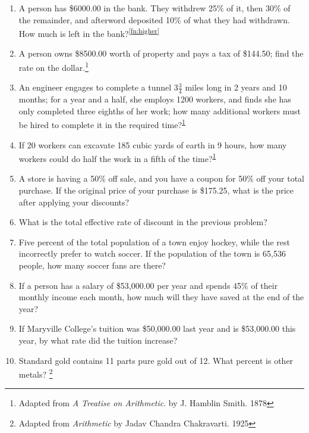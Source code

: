 \documentclass{article}
\begin{document}
\begin{enumerate}
\item A person has \$6000.00 in the bank.  They withdrew 25\% of it,
then 30\% of the remainder, and afterword deposited 10\% of what they
had withdrawn. How much is left in the bank?\textsuperscript{\ref{fn:higher}}

\item A person owns \$8500.00 worth of property and pays a tax of \$144.50; find the rate on the dollar.\footnote{Adapted from {\em A Treatise on Arithmetic}. by J. Hamblin Smith. 1878\label{fn:treatise}}

\item An engineer engages to complete a tunnel $3\frac{3}{4}$ miles
long in 2 years and 10 months; for a year and a half, she employs 1200
workers, and finds she has only completed three eighths of her work;
how many additional workers must be hired to complete it in the
required time?\textsuperscript{\ref{fn:treatise}}

\item If 20 workers can excavate 185 cubic yards of earth in 9 hours,
how many workers could do half the work in a fifth of the
time?\textsuperscript{\ref{fn:treatise}}

\item A store is having a 50\% off sale, and you have a coupon for 50\% off your total purchase.  If the original price of your purchase is \$175.25, what is the price after applying your discounts?

\item What is the total effective rate of discount in the previous problem?

\item Five percent of the total population of a town 
enjoy hockey, while the rest incorrectly prefer to watch soccer.  If the population of the town is 65,536 people, how many soccer fans are there?

\item If a person has a salary of \$53,000.00 per year and spends 45\% of their monthly income each month, how much will they have
saved at the end of the year?

\item If Maryville College's tuition was \$50,000.00 last year and is \$53,000.00 this year, by what rate did the tuition increase?

\item Standard gold contains 11 parts pure gold out of 12.  What percent is other metals? \footnote{Adapted from {\em Arithmetic} by Jadav Chandra Chakravarti. 1925}

\end{enumerate}
\end{document}
